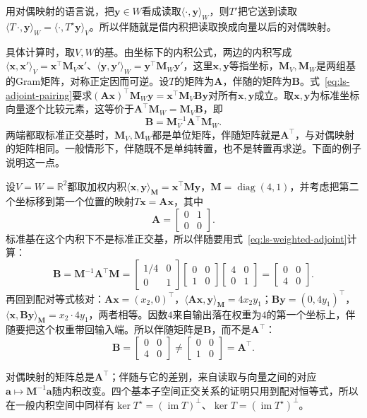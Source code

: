 用对偶映射的语言说，把$\bm y\in W$看成读取$\langle\cdot,\bm y\rangle_W$，则$T'$把它送到读取$\langle T\,\cdot,\bm y\rangle_W=\langle\cdot,T^\star\bm y\rangle_V$。所以伴随就是借内积把读取换成向量以后的对偶映射。

具体计算时，取$V,W$的基。由坐标下的内积公式，两边的内积写成$\langle\bm x,\bm x'\rangle_V=\bm x^\top\bm M_V\bm x'$、$\langle\bm y,\bm y'\rangle_W=\bm y^\top\bm M_W\bm y'$，这里$\bm x,\bm y$等指坐标，$\bm M_V,\bm M_W$是两组基的Gram矩阵，对称正定因而可逆。设$T$的矩阵为$\bm A$，伴随的矩阵为$\bm B$。式~\eqref{eq:ls-adjoint-pairing}要求$(\bm A\bm x)^\top\bm M_W\bm y=\bm x^\top\bm M_V\bm B\bm y$对所有$\bm x,\bm y$成立。取$\bm x,\bm y$为标准坐标向量逐个比较元素，这等价于$\bm A^\top\bm M_W=\bm M_V\bm B$，即
\begin{equation}
 \bm B=\bm M_V^{-1}\bm A^\top\bm M_W.
 \label{eq:ls-weighted-adjoint}
\end{equation}
两端都取标准正交基时，$\bm M_V,\bm M_W$都是单位矩阵，伴随矩阵就是$\bm A^\top$，与对偶映射的矩阵相同。一般情形下，伴随既不是单纯转置，也不是转置再求逆。下面的例子说明这一点。
\begin{example}[加权内积下的伴随]
\label{ex:ls-weighted-adjoint}
设$V=W=\mathbb R^2$都取加权内积$\langle\bm x,\bm y\rangle_{\bm M}=\bm x^\top\bm M\bm y$，$\bm M=\operatorname{diag}(4,1)$，并考虑把第二个坐标移到第一个位置的映射$T\bm x=\bm A\bm x$，其中
\[
 \bm A=\begin{bmatrix}0&1\\0&0\end{bmatrix}.
\]
标准基在这个内积下不是标准正交基，所以伴随要用式~\eqref{eq:ls-weighted-adjoint}计算：
\[
 \bm B=\bm M^{-1}\bm A^\top\bm M
 =\begin{bmatrix}1/4&0\\0&1\end{bmatrix}\begin{bmatrix}0&0\\1&0\end{bmatrix}\begin{bmatrix}4&0\\0&1\end{bmatrix}
 =\begin{bmatrix}0&0\\4&0\end{bmatrix}.
\]
再回到配对等式核对：$\bm A\bm x=(x_2,0)^\top$，$\langle\bm A\bm x,\bm y\rangle_{\bm M}=4x_2y_1$；$\bm B\bm y=(0,4y_1)^\top$，$\langle\bm x,\bm B\bm y\rangle_{\bm M}=x_2\cdot4y_1$，两者相等。因数$4$来自输出落在权重为$4$的第一个坐标上，伴随要把这个权重带回输入端。所以伴随矩阵是$\bm B$，而不是$\bm A^\top$：
\[
 \bm B=\begin{bmatrix}0&0\\4&0\end{bmatrix}\neq\begin{bmatrix}0&0\\1&0\end{bmatrix}=\bm A^\top.
\]
\end{example}
对偶映射的矩阵总是$\bm A^\top$；伴随与它的差别，来自读取与向量之间的对应$\bm a\mapsto\bm M^{-1}\bm a$随内积改变。四个基本子空间正交关系的证明只用到配对恒等式，所以在一般内积空间中同样有$\ker T^\star=(\operatorname{im}T)^\perp$、$\ker T=(\operatorname{im}T^\star)^\perp$。

